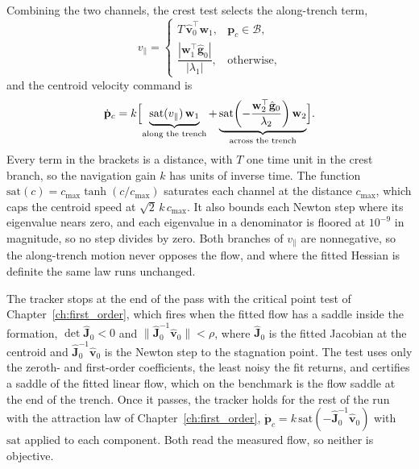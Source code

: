 Combining the two channels, the crest test selects the along-trench term,
\begin{equation}
    v_\parallel =
    \begin{cases}
        T\,\hat{\mathbf{v}}_0^\top \mathbf{w}_1,
            & \mathbf{p}_c \in \mathcal{B}, \\[6pt]
        \dfrac{|\mathbf{w}_1^\top \hat{\mathbf{g}}_0|}{|\lambda_1|},
            & \text{otherwise},
    \end{cases}
    \label{eq:ch7:vpar}
\end{equation}
and the centroid velocity command is
\begin{equation}
    \dot{\mathbf{p}}_c = k\Bigl[
    \underbrace{\mathrm{sat}(v_\parallel)\,\mathbf{w}_1}_{\text{along the trench}}
    + \underbrace{\mathrm{sat}\!\left(-\frac{\mathbf{w}_2^\top
      \hat{\mathbf{g}}_0}{\lambda_2}\right)\mathbf{w}_2}_{\text{across the trench}}\Bigr].
    \label{eq:ch7:d_law}
\end{equation}
Every term in the brackets is a distance, with $T$ one time unit in the
crest branch, so the navigation gain $k$ has units of inverse time. The
function $\mathrm{sat}(c) = c_{\max}\tanh(c/c_{\max})$ saturates each
channel at the distance $c_{\max}$, which caps the centroid speed at
$\sqrt{2}\,k\,c_{\max}$. It also bounds each Newton step where its
eigenvalue nears zero, and each eigenvalue in a denominator is floored at
$10^{-9}$ in magnitude, so no step divides by zero. Both branches of
$v_\parallel$ are nonnegative, so the along-trench motion never opposes
the flow, and where the fitted Hessian is definite the same law runs
unchanged.

The tracker stops at the end of the pass with the critical point test of
Chapter~\ref{ch:first_order}, which fires when the fitted flow has a saddle inside the
formation,
$\det\hat{\mathbf{J}}_0 < 0$ and
$\|\hat{\mathbf{J}}_0^{-1}\hat{\mathbf{v}}_0\| < \rho$, where $\hat{\mathbf{J}}_0$ is the fitted Jacobian at the centroid and
$\hat{\mathbf{J}}_0^{-1}\hat{\mathbf{v}}_0$ is the Newton step to the
stagnation point. The test uses only the zeroth- and first-order
coefficients, the least noisy the fit returns, and certifies a saddle of
the fitted linear flow, which on the benchmark is the flow saddle at the
end of the trench. Once it passes, the tracker
holds for the rest of the run with the attraction law of Chapter~\ref{ch:first_order},
$\dot{\mathbf{p}}_c = k\,\mathrm{sat}(-\hat{\mathbf{J}}_0^{-1}\hat{\mathbf{v}}_0)$
with $\mathrm{sat}$ applied to each component. Both read the measured
flow, so neither is objective.

